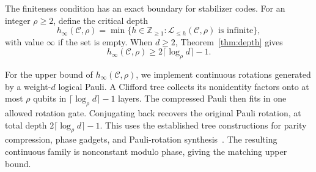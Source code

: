 \documentclass[aps,prl,reprint,notitlepage,nofootinbib,nobibnotes]{revtex4-2}
\begin{document}
The finiteness condition has an exact boundary for stabilizer codes. For an integer \(\rho\ge2\), define the critical depth
\begin{equation}\label{eq:critical-definition}
 h_\infty(\mathcal C,\rho)
  =\min\{h\in\mathbb Z_{\ge1}:\mathcal L_{\le h}(\mathcal C,\rho)
                   \text{ is infinite}\},
\end{equation}
with value \(\infty\) if the set is empty. When \(d\ge2\), Theorem~\ref{thm:depth} gives
\begin{equation}\label{eq:critical-lower}
 h_\infty(\mathcal C,\rho)\ge2\lceil\log_{\rho} d\rceil-1.
\end{equation}

For the upper bound of $h_\infty(\mathcal C,\rho)$, we implement continuous
rotations generated by a weight-\(d\) logical Pauli. A Clifford tree
collects its nonidentity factors onto at most \(\rho\) qubits in
\(\lceil\log_\rho d\rceil-1\) layers. The compressed Pauli then fits
in one allowed rotation gate. Conjugating back recovers the original
Pauli rotation, at total depth \(2\lceil\log_\rho d\rceil-1\).
This uses the established tree constructions for parity compression,
phase gadgets, and Pauli-rotation
synthesis~\cite{BonetMonroig,Cowtan,HaahLiuTan}.
The resulting continuous family is nonconstant modulo phase, giving
the matching upper bound.
\end{document}
